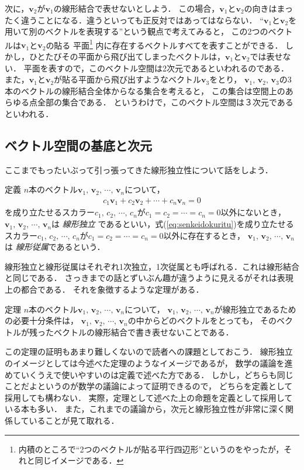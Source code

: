 次に，$\bm{v}_2$が$\bm{v}_1$の線形結合で表せないとしよう．
この場合，$\bm{v}_1$と$\bm{v}_2$の向きはまったく違うことになる．違うといっても正反対ではあってはならない．
``$\bm{v}_1$と$\bm{v}_2$を用いて別のベクトルを表現する''という観点で考えてみると，
この2つのベクトルは$\bm{v}_1$と$\bm{v}_2$の貼る
平面\footnote{内積のところで``2つのベクトルが貼る平行四辺形''というのをやったが，それと同じイメージである．}
内に存在するベクトルすべてを表すことができる．
しかし，ひとたびその平面から飛び出てしまったベクトルは，$\bm{v}_1$と$\bm{v}_2$では表せない．
平面を表すので，このベクトル空間は2次元であるといわれるのである．
また，$\bm{v}_1$と$\bm{v}_2$が貼る平面から飛び出すようなベクトル$\bm{v}_3$をとり，
$\bm{v}_1, \, \bm{v}_2, \, \bm{v}_3$の3本のベクトルの線形結合全体からなる集合を考えると，
この集合は空間上のあらゆる点全部の集合である．
というわけで，このベクトル空間は３次元であるといわれる．

\subsection{ベクトル空間の基底と次元}
ここまでもったいぶって引っ張ってきた線形独立性について話をしよう．
\begin{itembox}[l]{定義}
$n$本のベクトル$ \bm{v}_1, \, \bm{v}_2, \, \cdots, \, \bm{v}_n $について，
\begin{align}
c_1 \bm{v}_1 + c_2 \bm{v}_2 + \cdots + c_n \bm{v}_n = 0
\label{eq:senkeidokuritu}
\end{align}
を成り立たせるスカラー$c_1, \, c_2, \, \cdots , \, c_n$が$c_1=c_2=\cdots=c_n=0$以外にないとき，
$ \bm{v}_1, \, \bm{v}_2, \, \cdots, \, \bm{v}_n $は
\emph{線形独立}
であるといい，式(\ref{eq:senkeidokuritu})を成り立たせる
スカラー$c_1, \, c_2, \, \cdots , \, c_n$が$c_1=c_2=\cdots=c_n=0$以外に存在するとき，
$ \bm{v}_1, \, \bm{v}_2, \, \cdots, \, \bm{v}_n $は
\emph{線形従属}であるという．
\end{itembox}
線形独立と線形従属はそれぞれ1次独立，1次従属とも呼ばれる．これは線形結合と同じである．
さっきまでの話とずいぶん趣が違うように見えるがそれは表現上の都合である．
それを象徴するような定理がある．
\begin{itembox}[l]{定理}
$n$本のベクトル$ \bm{v}_1, \, \bm{v}_2, \, \cdots, \, \bm{v}_n $について，
$ \bm{v}_1, \, \bm{v}_2, \, \cdots, \, \bm{v}_n $が線形独立であるための必要十分条件は，
$ \bm{v}_1, \, \bm{v}_2, \, \cdots, \, \bm{v}_n $の中からどのベクトルをとっても，
そのベクトルが残ったベクトルの線形結合で書き表せないことである．
\end{itembox}
この定理の証明もあまり難しくないので読者への課題としておこう．
線形独立のイメージとしては今述べた定理のようなイメージであるが，
数学の議論を進めていくうえで使いやすいのは定義で述べた方である．
しかし，どちらも同じことだよというのが数学の議論によって証明できるので，
どちらを定義として採用しても構わない．
実際，定理として述べた上の命題を定義として採用している本も多い．
また，これまでの議論から，次元と線形独立性が非常に深く関係していることが見て取れる．

